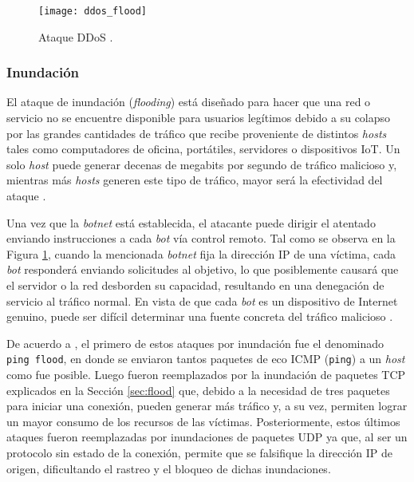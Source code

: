 \begin{figure}[H]
	\centering 
	\texttt{[image: ddos\_flood]}
	\caption[Ataque DDoS]{Ataque DDoS \parencite{ddos_amir}.}
	\label{fig:ddos_flood}
\end{figure}


\subsubsection*{Inundación}

El ataque de inundación (\textit{flooding}) está diseñado para hacer que una red
o servicio no se encuentre disponible para usuarios legítimos debido a su
colapso por las grandes cantidades de tráfico que recibe proveniente de
distintos \textit{hosts} tales como computadores de oficina, portátiles,
servidores o dispositivos IoT. Un solo \textit{host} puede generar decenas de
megabits por segundo de tráfico malicioso y, mientras más \textit{hosts} generen
este tipo de tráfico, mayor será la efectividad del ataque \parencite{ddos_hh}.

Una vez que la \textit{botnet} está establecida, el atacante puede dirigir el
atentado enviando instrucciones a cada \textit{bot} vía control remoto. Tal como
se observa en la Figura \ref{fig:ddos_flood}, cuando la mencionada
\textit{botnet} fija la dirección IP de una víctima, cada \textit{bot}
responderá enviando solicitudes al objetivo, lo que posiblemente causará que el
servidor o la red desborden su capacidad, resultando en una denegación de
servicio al tráfico normal. En vista de que cada \textit{bot} es un dispositivo
de Internet genuino, puede ser difícil determinar una fuente concreta del
tráfico malicioso \parencite{ddos_flloogind}.

De acuerdo a \parencite{ddos_hh}, el primero de estos ataques por inundación fue
el denominado \verb|ping flood|, en donde se enviaron tantos paquetes de eco
ICMP (\verb|ping|) a un \textit{host} como fue posible. Luego fueron
reemplazados por la inundación de paquetes TCP explicados en la Sección
\ref{sec:flood} que, debido a la necesidad de tres paquetes para iniciar una
conexión, pueden generar más tráfico y, a su vez, permiten lograr un mayor
consumo de los recursos de las víctimas. Posteriormente, estos últimos ataques
fueron reemplazadas por inundaciones de paquetes UDP ya que, al ser un protocolo
sin estado de la conexión, permite que se falsifique la dirección IP de origen,
dificultando el rastreo y el bloqueo de dichas inundaciones.


